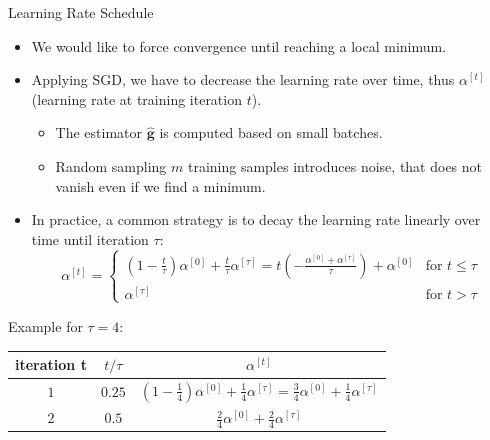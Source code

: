 \begin{vbframe}{Learning Rate Schedule}
  \begin{itemize}
    \item We would like to force convergence until reaching a local minimum.
    \item Applying SGD, we have to decrease the learning rate over time, thus $\alpha^{[t]}$ (learning rate at training iteration $t$).
      \begin{itemize}
        \item The estimator $\hat{\mathbf{g}}$ is computed based on small batches.
        \item Random sampling $m$ training samples introduces noise, that does not vanish even if we find a minimum.
      \end{itemize}
    \item In practice, a common strategy is to decay the learning rate linearly over time until iteration $\tau$:
         \begin{equation*}
         \alpha^{[t]} = \begin{cases}
         \left( 1 - \frac{t}{\tau} \right)\alpha^{[0]} + \frac{t}{\tau}\alpha^{[\tau]}
                    = t\left(-\frac{\alpha^{[0]} +  \alpha^{[\tau]}}{\tau}\right) + \alpha^{[0]} & 
                    \text{for $t\le\tau$} \\
                    \alpha^{[\tau]} & \text{for $t>\tau$} \end{cases}
         \end{equation*}
  \end{itemize}
  
\framebreak


\scriptsize Example for $\tau = 4$:
\begin{minipage}{\linewidth}
\centering
  \begin{center}
        {\footnotesize
        \begin{tabular}{l | c | c}
        iteration t &  $t/\tau$ & $\alpha^{[t]}$ \\ \hline
        \multicolumn{1}{c|}{$1$}       
        & $0.25$  
        & $\left(1-\frac{1}{4}\right)\alpha^{[0]} + \frac{1}{4}\alpha^{[\tau]} = \frac{3}{4}\alpha^{[0]} + \frac{1}{4}\alpha^{[\tau]}$\\
        
        \multicolumn{1}{c|}{$2$}       
        & $0.5$   
        & $\frac{2}{4}\alpha^{[0]} + \frac{2}{4}\alpha^{[\tau]}$ \\
        

\end{tabular}}
\end{center}
\end{minipage}
\end{vbframe}

